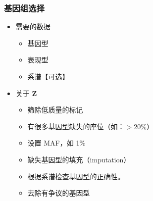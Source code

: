 \documentclass[serif,aspectratio=169]{beamer}
\begin{document}
\begin{frame}
  \frametitle{基因组选择}
  \begin{itemize}
  \item 需要的数据
    \begin{itemize}
    \item 基因型
    \item 表现型
    \item 系谱【可选】
    \end{itemize}
  \item 关于 $\mathbf{Z}$
    \begin{itemize}
    \item 筛除低质量的标记
    \item 有很多基因型缺失的座位（如：$>20$\%）
    \item 设置 MAF，如 1\%
    \item 缺失基因型的填充（imputation）
    \item 根据系谱检查基因型的正确性。
    \item 去除有争议的基因型
    \end{itemize}
  \end{itemize}
\end{frame}
\end{document}
